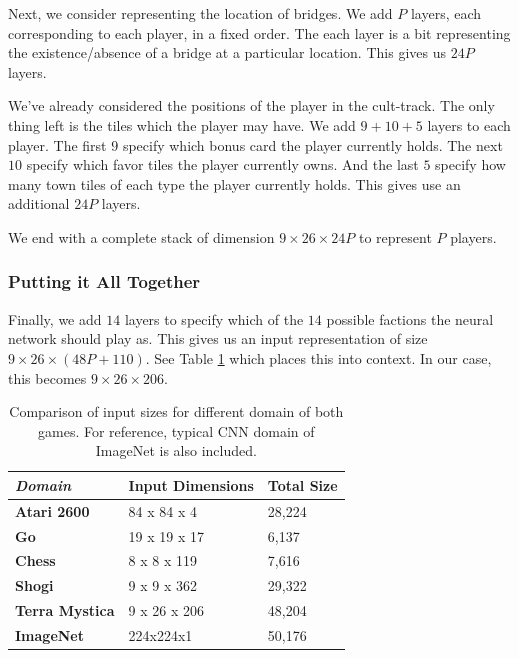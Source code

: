 \documentclass[10pt,twocolumn,letterpaper]{article}
\begin{document}
Next, we consider representing the location of bridges. We add $P$ layers, each corresponding to each player, in a fixed order. The each layer is a bit representing the existence/absence of a bridge at a particular location. This gives us $24P$ layers.

We've already considered the positions of the player in the cult-track. The only thing left is the tiles which the player may have. We add $9 + 10 + 5$ layers to each player. The first $9$ specify which bonus card the player currently holds. The next $10$ specify which favor tiles the player currently owns. And the last $5$ specify how many town tiles of each type the player currently holds. This gives use an additional $24P$ layers.

We end with a complete stack of dimension $9 \times 26 \times 24P$ to represent $P$ players.

\subsubsection{Putting it All Together}
\label{subsubsection:final_input}
Finally, we add $14$ layers to specify which of the $14$ possible factions the neural network should play as. This gives us an input representation of size $9 \times 26 \times (48P + 110)$. See Table \ref{table:input_size_comparison} which places this into context. In our case, this becomes $9 \times 26 \times 206$.

\begin{table}[!ht]
\begin{tabular}{|l|l|l|}
\hline
\textit{\textbf{Domain}} & \textbf{Input Dimensions} & \textbf{Total Size} \\ \hline
\textbf{Atari 2600}      & 84 x 84 x 4               & 28,224              \\ \hline
\textbf{Go}              & 19 x 19 x 17              & 6,137               \\ \hline
\textbf{Chess}           & 8 x 8 x 119               & 7,616               \\ \hline
\textbf{Shogi}           & 9 x 9 x 362               & 29,322              \\ \hline
\textbf{Terra Mystica}   & 9 x 26 x 206              & 48,204              \\ \hline
\textbf{ImageNet}        & 224x224x1                 & 50,176              \\ \hline
\end{tabular}
\caption{Comparison of input sizes for different domain of both games. For reference, typical CNN domain of ImageNet is also included.}
\label{table:input_size_comparison}
\end{table}
\end{document}
